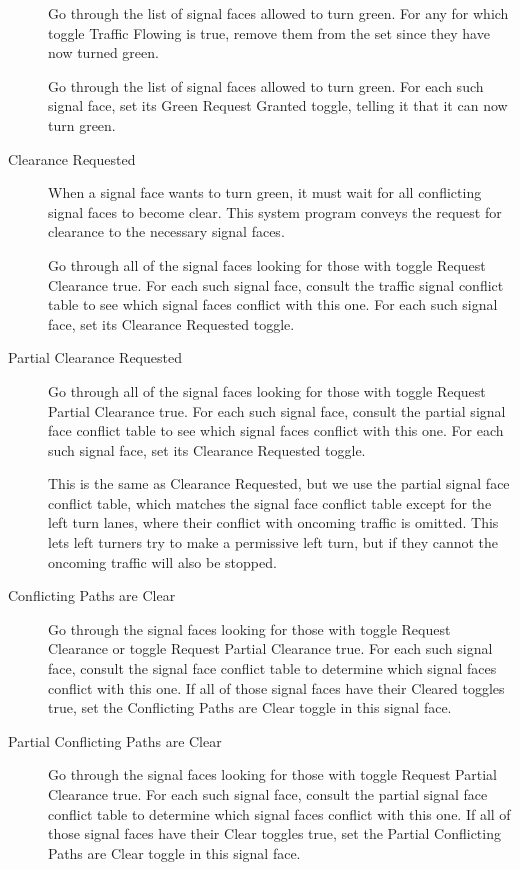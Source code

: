 \documentclass[letterpaper,twoside]{article}
\begin{document}
\begin{description}
Go through the list of signal faces allowed to turn green.  For any
for which toggle Traffic Flowing is true, remove them from the set
since they have now turned green.

Go through the list of signal faces allowed to turn green.  For each
such signal face, set its Green Request Granted toggle, telling it
that it can now turn green.

\item[Clearance Requested]

When a signal face wants to turn green, it must wait for all conflicting
signal faces to become clear.  This system program conveys the request
for clearance to the necessary signal faces.

Go through all of the signal faces looking for those with toggle
Request Clearance true.  For each such signal face, consult the traffic
signal conflict table to see which signal faces conflict with this one.
For each such signal face, set its Clearance Requested toggle.

\item[Partial Clearance Requested]

Go through all of the signal faces looking for those with toggle
Request Partial Clearance true.  For each such signal face, consult the
partial signal face conflict table to see which signal faces conflict
with this one.
For each such signal face, set its Clearance Requested toggle.

This is the same as Clearance Requested, but we use the partial signal face
conflict table, which matches the signal face conflict table except
for the left turn lanes, where their conflict with oncoming traffic is
omitted.
This lets left turners try to make a
permissive left turn, but if they cannot the oncoming traffic will also
be stopped.

\item[Conflicting Paths are Clear]

Go through the signal faces looking for those with toggle Request Clearance
or toggle Request Partial Clearance
true.  For each such signal face, consult the signal face conflict table
to determine which signal faces conflict with this one.  If all of those
signal faces have their Cleared toggles true, set the Conflicting Paths
are Clear toggle in this signal face.

\item[Partial Conflicting Paths are Clear]

Go through the signal faces looking for those with toggle Request Partial
Clearance true.  For each such signal face, consult the partial
signal face conflict table to determine which signal faces conflict
with this one.  If all of those signal faces have their Clear toggles
true, set the Partial Conflicting Paths are Clear toggle in this
signal face.


\end{description}
\end{document}
